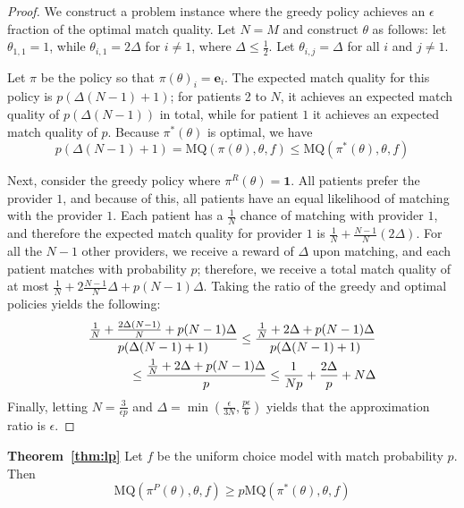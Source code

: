 \documentclass[11pt]{article}
\begin{document}
\begin{proof}
    
    We construct a problem instance where the greedy policy achieves an $\epsilon$ fraction of the optimal match quality. 
    Let $N=M$ and construct $\theta$ as follows: let $\theta_{1,1} = 1$, while $\theta_{i,1} = 2 \Delta$ for $i \neq 1$, where $\Delta \leq \frac{1}{2}$. Let $\theta_{i,j} = \Delta$ for all $i$ and $j \neq 1$. 

    Let $\pi$ be the policy so that $\pi(\theta)_{i} = \mathbf{e}_{i}$. 
    The expected match quality for this policy is $p(\Delta (N-1) + 1)$; for patients 2 to $N$, it achieves an expected match quality of $p(\Delta (N-1))$ in total, while for patient $1$ it achieves an expected match quality of $p$. 
    Because $\pi^{*}(\theta)$ is optimal, we have  
    \begin{equation}
        p(\Delta (N-1) + 1) = \mathrm{MQ}(\pi(\theta),\theta,f) \leq \mathrm{MQ}(\pi^{*}(\theta),\theta,f)
    \end{equation}

    Next, consider the greedy policy where $\pi^{R}(\theta) = \mathbf{1}$.
    All patients prefer the provider $1$, and because of this, all patients have an equal likelihood of matching with the provider $1$. 
    Each patient has a $\frac{1}{N}$ chance of matching with provider $1$, and therefore the expected match quality for provider $1$ is $\frac{1}{N} + \frac{N-1}{N} (2 \Delta)$. 
    For all the $N-1$ other providers, we receive a reward of $\Delta$ upon matching, and each patient matches with probability $p$; therefore, we receive a total match quality of at most $\frac{1}{N} + 2  \frac{N-1}{N} \Delta + p(N-1) \Delta$. 
    Taking the ratio of the greedy and optimal policies yields the following: 
    \begin{align}
        \small 
        \frac{\frac{1}{N} + \frac{2\Delta(N-1)}{N} + p(N-1) \Delta}{p (\Delta (N-1) + 1)} 
         \leq \frac{\frac{1}{N} + 2\Delta + p(N-1) \Delta}{p(\Delta (N-1) + 1)}  \\ \leq \frac{\frac{1}{N} + 2\Delta + p(N-1) \Delta}{p} 
         \leq \frac{1}{Np} + \frac{2\Delta}{p} + N \Delta 
    \end{align}
    Finally, letting $N=\frac{3}{\epsilon p}$ and $\Delta = \min(\frac{\epsilon}{3N},\frac{p\epsilon}{6})$ yields that the approximation ratio is $\epsilon$. 
\end{proof}

\textbf{Theorem~\ref{thm:lp}}
Let $f$ be the uniform choice model with match probability $p$. 
Then 
\begin{equation}
    \mathrm{MQ}(\pi^{P}(\theta),\theta,f) \geq p \mathrm{MQ}(\pi^{*}(\theta),\theta,f) 
\end{equation}
\end{document}
